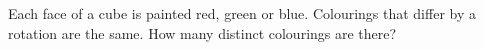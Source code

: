 Each face of a cube is painted red, green or blue. Colourings that differ by a rotation are the same. How many distinct colourings are there?
